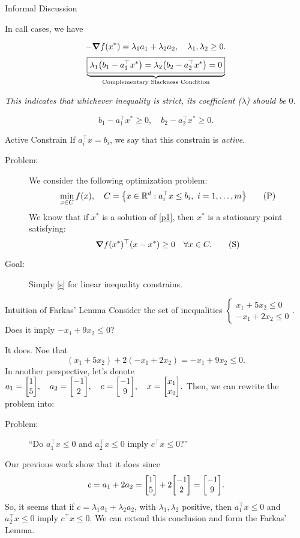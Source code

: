 \begin{eg}{Informal Discussion}
\begin{itemize}
\begin{itemize}
	\end{itemize}
	\end{itemize}
	In call cases, we have \begin{tcolorbox}[title=KKT Conditions]\[-\grad f(x^*)=\lambda_1a_1+\lambda_2a_2,\quad\lambda_1,\lambda_2\geq0.\]\[\underbrace{\boxed{\lambda_1\qty(b_1-a_1^\top x^*)=\lambda_2\qty(b_2-a_2^\top x^*)=0}}_\text{Complementary Slackness Condition}\] \begin{center}\textit{This indicates that whichever inequality is strict, its coefficient ($\lambda$) should be $0$. }\end{center} \[b_1-a_1^\top x^*\geq0,\quad b_2-a_2^\top x^*\geq0.\]\end{tcolorbox}
\end{eg}
\begin{df}{Active Constrain}
	If $a_i^\top x=b_i$, we say that this constrain is \textit{active}.	
\end{df}
\begin{description}
	\item[Problem: ] We consider the following optimization problem: \begin{equation}\label{p1}\min_{x\in C}f(x),\quad C=\qty{x\in{\mathbb{R}}^d:a_i^\top x\leq b_i,\ i=1,\dots,m}\tag{P}\end{equation} We know that if $x^*$ is a solution of \eqref{p1}, then $x^*$ is a stationary point satisfying: \begin{equation}\label{s}\grad f(x^*)^\top(x-x^*)\geq0\quad\forall x\in C.\tag{S}\end{equation}
	\item[Goal: ] Simply \eqref{s} for linear inequality constrains. 
\end{description}
\begin{eg}{Intuition of Farkas' Lemma}
	Consider the set of inequalities $\begin{cases}x_1+5x_2\leq0\\-x_1+2x_2\leq0\end{cases}$. Does it imply $-x_1+9x_2\leq0$?
	\begin{sol}
		It does. Noe that \[(x_1+5x_2)+2(-x_1+2x_2)=-x_1+9x_2\leq0.\]
		In another perspective, let's denote $a_1=\mqty[1\\5],\quad a_2=\mqty[-1\\2],\quad c=\mqty[-1\\9],\quad x=\mqty[x_1\\x_2].$ Then, we can rewrite the problem into:
		\begin{description}
			\item[Problem: ] ``Do $a_1^\top x\leq0$ and $a_2^\top x\leq0$ imply $c^\top x\leq0$?''
		\end{description}
		Our previous work show that it does since \[c=a_1+2a_2=\mqty[1\\5]+2\mqty[-1\\2]=\mqty[-1\\9].\] So, it seems that if $c=\lambda_1a_1+\lambda_2a_2$, with $\lambda_1,\lambda_2$ positive, then $a_1^\top x\leq0$ and $a_2^\top x\leq0$ imply $c^\top x\leq0$. We can extend this conclusion and form the Farkas' Lemma. 
	\end{sol}	
\end{eg}
